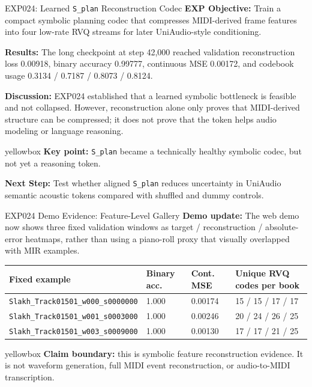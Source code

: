 \documentclass[aspectratio=169,11pt]{beamer}
\newcommand{\code}[1]{\texttt{\footnotesize #1}}
\newcommand{\expfield}[2]{\textbf{#1:} #2\par\vspace{0.10cm}}
\newenvironment{keybox}{%
  \begin{beamercolorbox}[rounded=true,sep=0.14cm,wd=\linewidth]{yellowbox}\footnotesize%
}{%
  \end{beamercolorbox}%
}
\begin{document}
\begin{frame}{EXP024: Learned \code{S\_plan} Reconstruction Codec}
  \footnotesize
  \expfield{EXP Objective}{Train a compact symbolic planning codec that compresses MIDI-derived frame features into four low-rate RVQ streams for later UniAudio-style conditioning.}
  \expfield{Results}{The long checkpoint at step 42,000 reached validation reconstruction loss 0.00918, binary accuracy 0.99777, continuous MSE 0.00172, and codebook usage 0.3134 / 0.7187 / 0.8073 / 0.8124.}
  \expfield{Discussion}{EXP024 established that a learned symbolic bottleneck is feasible and not collapsed. However, reconstruction alone only proves that MIDI-derived structure can be compressed; it does not prove that the token helps audio modeling or language reasoning.}
  \begin{keybox}\textbf{Key point:} \code{S\_plan} became a technically healthy symbolic codec, but not yet a reasoning token.\end{keybox}
  \vspace{0.18cm}
  \expfield{Next Step}{Test whether aligned \code{S\_plan} reduces uncertainty in UniAudio semantic acoustic tokens compared with shuffled and dummy controls.}
\end{frame}

\begin{frame}{EXP024 Demo Evidence: Feature-Level Gallery}
  \footnotesize
  \expfield{Demo update}{The web demo now shows three fixed validation windows as target / reconstruction / absolute-error heatmaps, rather than using a piano-roll proxy that visually overlapped with MIR examples.}

  \begin{tabularx}{\linewidth}{p{4.0cm}p{1.55cm}p{1.65cm}Y}
    \toprule
    Fixed example & Binary acc. & Cont. MSE & Unique RVQ codes per book \\
    \midrule
    \code{Slakh\_Track01501\_w000\_s0000000} & 1.000 & 0.00174 & 15 / 15 / 17 / 17 \\
    \code{Slakh\_Track01501\_w001\_s0003000} & 1.000 & 0.00246 & 20 / 24 / 26 / 25 \\
    \code{Slakh\_Track01501\_w003\_s0009000} & 1.000 & 0.00130 & 17 / 17 / 21 / 25 \\
    \bottomrule
  \end{tabularx}

  \vspace{0.18cm}
  \begin{keybox}\textbf{Claim boundary:} this is symbolic feature reconstruction evidence. It is not waveform generation, full MIDI event reconstruction, or audio-to-MIDI transcription.\end{keybox}
\end{frame}
\end{document}
